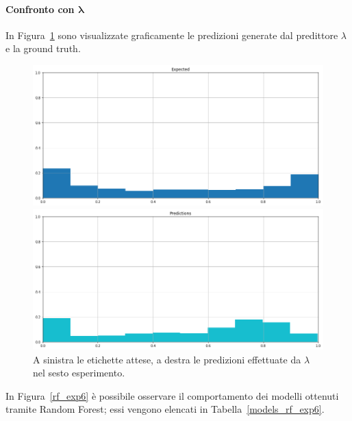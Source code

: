 \documentclass[12pt]{report}
\theoremstyle{definition}
\begin{document}
\paragraph{Confronto con $\bm{\lambda}$}
In Figura~\ref{prediction_exp6} sono visualizzate graficamente le predizioni generate dal predittore $\lambda$ e la ground truth.
\begin{figure}
\centering
    \begin{minipage}{0.48\textwidth}
        \includegraphics[width=\linewidth]{images/experiment_beta05_sovrapposti/expected_memberships.png}
    \end{minipage}
    \begin{minipage}{0.48\textwidth}
        \includegraphics[width=\linewidth]{images/experiment_beta05_sovrapposti/prediction_memberships.png}
    \end{minipage}
    \caption{A sinistra le etichette attese, a destra le predizioni effettuate da $\lambda$ nel sesto esperimento.}
    \label{prediction_exp6}
\end{figure} 

In Figura~\ref{rf_exp6} è possibile osservare il comportamento dei modelli ottenuti tramite Random Forest; essi vengono elencati in Tabella~\ref{models_rf_exp6}.
\end{document}
